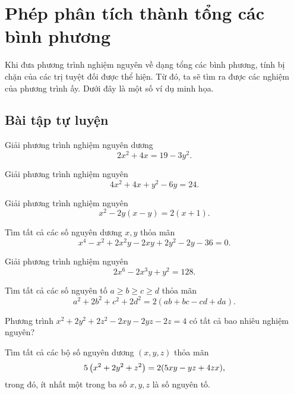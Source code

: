 \section{Phép phân tích thành tổng các bình phương}
Khi đưa phương trình nghiệm nguyên về dạng tổng các bình phương, tính bị chặn của các trị tuyệt đối được thể hiện. Từ đó, ta sẽ tìm ra được các nghiệm của phương trình ấy. Dưới đây là một số ví dụ minh họa.

\subsection*{Bài tập tự luyện}

\begin{btt}
Giải phương trình nghiệm nguyên dương $$2x^2+4x=19-3y^2.$$
\end{btt}

\begin{btt}
Giải phương trình nghiệm nguyên
$$4x^2+4x+y^2-6y=24.$$
\end{btt}

\begin{btt}
Giải phương trình nghiệm nguyên $$x^2-2y(x-y)=2(x+1).$$
\end{btt}

\begin{btt}
Tìm tất cả các số nguyên dương $x,y$ thỏa mãn
    $$x^4-x^2+2x^2y-2xy+2y^2-2y-36=0.$$
\end{btt}

\begin{btt}
Giải phương trình nghiệm nguyên 
\[2x^6-2x^3y+y^2=128.\]
\end{btt}

\begin{btt}
Tìm tất cả các số nguyên tố $a\geqslant b\geqslant c\geqslant d$ thỏa mãn
$$a^2+2b^2+c^2+2d^2=2\left(ab+bc-cd+da\right).$$
\end{btt}

\begin{btt}
Phương trình $x^2+2y^2+2z^2-2xy-2yz-2z=4$ có tất cả bao nhiêu nghiệm nguyên?
\end{btt}

\begin{btt}
Tìm tất cả các bộ số nguyên dương $(x, y, z)$ thỏa mãn
$$5\left(\displaystyle x^{2}+2 y^{2}+z^{2} \right)=2(5 x y-y z+4 z x),$$
trong đó, ít nhất một trong ba số $x, y, z$ là số nguyên tố.
\end{btt}

